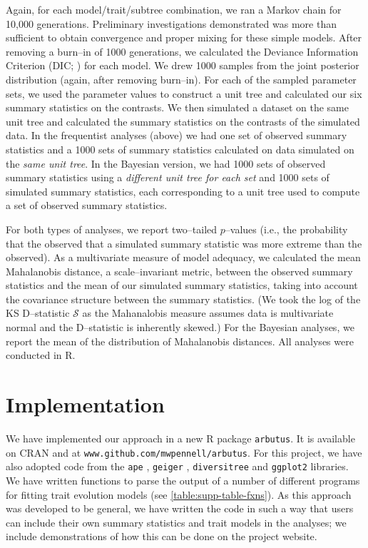 \documentclass[a4paper,12pt]{article}
\begin{document}
Again, for each model/trait/subtree combination, we ran a Markov chain for 10,000 generations. Preliminary investigations demonstrated was more than sufficient to obtain convergence and proper mixing for these simple models. After removing a burn--in of 1000 generations, we calculated the Deviance Information Criterion (DIC; \citep{dic}) for each model. We drew 1000 samples from the joint posterior distribution (again, after removing burn--in). For each of the sampled parameter sets, we used the parameter values to construct a unit tree and calculated our six summary statistics on the contrasts. We then simulated a dataset on the same unit tree and calculated the summary statistics on the contrasts of the simulated data. In the frequentist analyses (above) we had one set of observed summary statistics and a 1000 sets of summary statistics calculated on data simulated on the \emph{same unit tree}. In the Bayesian version, we had 1000 sets of observed summary statistics using a \emph{different unit tree for each set} and 1000 sets of simulated summary statistics, each corresponding to a unit tree used to compute a set of observed summary statistics.
 
For both types of analyses, we report two--tailed $p$--values (i.e., the probability that the observed that a simulated summary statistic was more extreme than the observed). As a multivariate measure of model adequacy, we calculated the mean Mahalanobis distance, a scale--invariant metric, between the observed summary statistics and the mean of our simulated summary statistics, taking into account the covariance structure between the summary statistics. (We took the log of the KS D--statistic $\mathcal{S}$ as the Mahanalobis measure assumes data is multivariate normal and the D--statistic is inherently skewed.) For the Bayesian analyses, we report the mean of the distribution of Mahalanobis distances. All analyses were conducted in R.

\section{Implementation}

We have implemented our approach in a new R package \texttt{arbutus}. It is available on CRAN and at \texttt{www.github.com/mwpennell/arbutus}. For this project, we have also adopted code from the \texttt{ape} \citep{ape}, \texttt{geiger} \citep{geiger}, \texttt{diversitree} \citep{FitzJohn2012} and \texttt{ggplot2} \citep{ggplot2} libraries. We have written functions to parse the output of a number of different programs for fitting trait evolution models (see \ref{table:supp-table-fxns}). As this approach was developed to be general, we have written the code in such a way that users can include their own summary statistics and trait models in the analyses; we include demonstrations of how this can be done on the project website.
\end{document}
